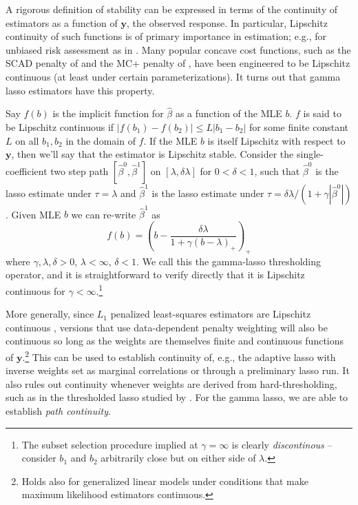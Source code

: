 \documentclass[12pt]{article}
\newcommand{\bm}[1]{\mathbf{#1}}
\begin{document}
A rigorous definition of stability can be expressed in terms of the continuity
of  estimators as a function of $\bm{y}$, the observed response.  In
particular, Lipschitz continuity of such functions is of primary importance in
estimation; e.g., for unbiased risk assessment as in
\cite{stein_estimation_1981}.  Many popular concave cost functions, such as
the SCAD penalty of \cite{fan_variable_2001} and the MC+ penalty of
\citet{zhang_nearly_2010}, have been engineered to be Lipschitz continuous (at
least under certain parameterizations).  It turns out that gamma lasso
estimators have this property.

Say $f(b)$ is the implicit function for $\hat\beta$ as a function of the MLE
$b$.  $f$ is said to be Lipschitz continuous if  $ |f(b_1)-f(b_2)| \leq
L|b_1-b_2| $ for some finite constant $L$ on all $b_1,b_2$ in the domain of
$f$. If the MLE $b$ is itself Lipschitz with respect to $\bm{y}$, then we'll
say that the estimator is Lipschitz stable.    Consider the single-coefficient
two step path $[\hat\beta^0,\hat\beta^1]$ on $[\lambda,\delta\lambda]$ for
$0<\delta<1$, such that $\hat\beta^0$ is the lasso estimate under $\tau =
\lambda$ and $\hat\beta^1$ is the lasso estimate under $\tau =
\delta\lambda/(1+\gamma|\hat\beta^0|)$. Given MLE $b$ we can re-write
$\hat\beta^1$ as \begin{equation}\label{twostep} f(b) = \left(b -
\frac{\delta\lambda}{1+\gamma(b-\lambda)_+}\right)_+  \end{equation} where
$\gamma,\lambda,\delta >0$, $\lambda < \infty$, $\delta<1$.  We call this the
gamma-lasso thresholding operator, and it is straightforward to verify
directly that it is Lipschitz continuous for $\gamma < \infty$.\footnote{The subset selection procedure implied at
$\gamma=\infty$ is clearly  {\it
discontinous} -- consider $b_1$ and $b_2$ arbitrarily close but on
either side of $\lambda$.}

More generally, since $L_1$ penalized least-squares estimators are Lipschitz continuous \cite[][]{zou_degrees_2007}, versions that use data-dependent penalty weighting will also be continuous so long as the weights are themselves finite and continuous functions of $\bm{y}$.\footnote{Holds also for generalized linear models under conditions that make maximum likelihood estimators continuous.}  This can be used to establish continuity of, e.g., the adaptive lasso with inverse weights set as marginal correlations or through a preliminary lasso run.  It also rules out continuity whenever weights are derived from hard-thresholding, such as in the thresholded lasso studied by \cite{van_de_geer_adaptive_2011}.
For the gamma lasso, we are able to establish {\it path continuity}.
\end{document}
